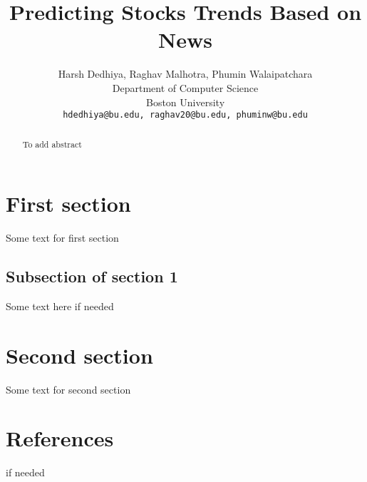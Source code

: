 \documentclass{article}
\title{Predicting Stocks Trends Based on News}
\author{
Harsh Dedhiya, Raghav Malhotra, Phumin Walaipatchara\\
Department of Computer Science\\
Boston University\\
\texttt{hdedhiya@bu.edu, raghav20@bu.edu, phuminw@bu.edu}\\
}
\begin{document}
\maketitle
\begin{abstract}
    To add abstract
\end{abstract}
\section{First section}
Some text for first section

\subsection{Subsection of section 1}
Some text here if needed

\section{Second section}
Some text for second section

\section*{References}
if needed
\end{document}
